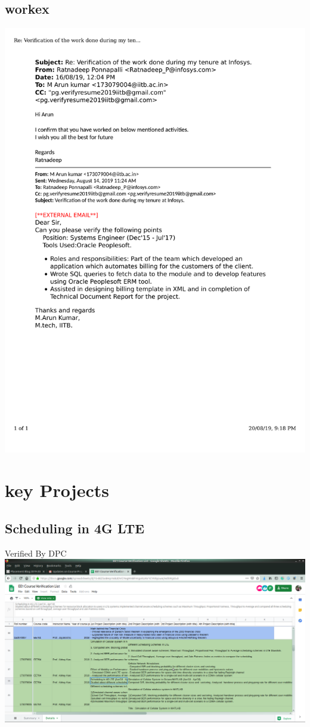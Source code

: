 \documentclass{article}
\begin{document}
	\subsection{workex}
	\includegraphics[page=1, scale=0.5]{proofs/workex.pdf}\\
\section{key Projects}
	
	\subsection{Scheduling in 4G LTE}
		Verified By DPC\\
		\includegraphics[page=1, scale=0.25]{proofs/wireless_project.png}
\end{document}
